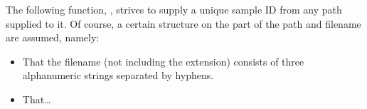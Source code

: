 The following function, , strives to supply a unique sample ID from any path supplied to it. Of course, a certain structure on the part of the path and filename are assumed, namely:
\begin{itemize}
\item That the filename (not including the extension) consists of three alphanumeric strings separated by hyphens.
\item That\ldots
\end{itemize}

